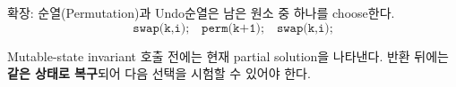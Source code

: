 \begin{frame}{확장: 순열(Permutation)과 Undo}순열은 남은 원소 중 하나를 choose한다.
\[
\texttt{swap(k,i);}\quad\texttt{perm(k+1);}\quad\texttt{swap(k,i);}
\]
\begin{block}{Mutable-state invariant}
호출 전에는 현재 partial solution을 나타낸다. 반환 뒤에는 \textbf{같은 상태로 복구}되어 다음 선택을 시험할 수 있어야 한다.
\end{block}
\end{frame}
